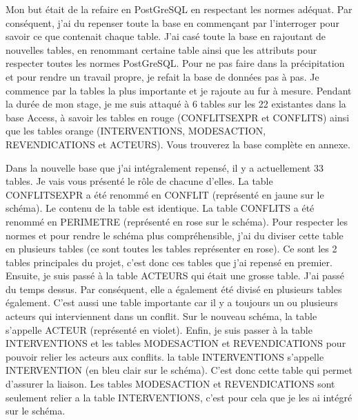 \documentclass[12pt,a4paper,titlepage,twoside]{report}
\begin{document}
Mon but était de la refaire en PostGreSQL en respectant les normes adéquat. Par conséquent, j'ai du repenser toute la base en commençant par l'interroger pour savoir ce que contenait chaque table. J'ai casé toute la base en rajoutant de nouvelles tables, en renommant certaine table ainsi que les attributs pour respecter toutes les normes PostGreSQL. \newline
Pour ne pas faire dans la précipitation et pour rendre un travail propre, je refait la base de données pas à pas. Je commence par la tables la plus importante et je rajoute au fur à mesure. Pendant la durée de mon stage, je me suis attaqué à 6 tables sur les 22 existantes dans la base Access, à savoir les tables en rouge (CONFLITSEXPR et CONFLITS) ainsi que les tables orange (INTERVENTIONS, MODESACTION, REVENDICATIONS et ACTEURS). Vous trouverez la base complète en annexe. \newline\newline

Dans la nouvelle base que j'ai intégralement repensé, il y a actuellement 33 tables. Je vais vous présenté le rôle de chacune d'elles. La table CONFLITSEXPR a été renommé en CONFLIT (représenté en jaune sur le schéma). Le contenu de la table est identique. La table CONFLITS a été renommé en PERIMETRE (représenté en rose sur le schéma). Pour respecter les normes et pour rendre le schéma plus compréhensible, j'ai du diviser cette table en plusieurs tables (ce sont toutes les tables représenter en rose). Ce sont les 2 tables principales du projet, c'est donc ces tables que j'ai repensé en premier.\newline
Ensuite, je suis passé à la table ACTEURS qui était une grosse table. J'ai passé du temps dessus. Par conséquent, elle a également été divisé en plusieurs tables également. C'est aussi une table importante car il y a toujours un ou plusieurs acteurs qui interviennent dans un conflit. Sur le nouveau schéma, la table s'appelle ACTEUR (représenté en violet). \newline
Enfin, je suis passer à la table INTERVENTIONS et les tables MODESACTION et REVENDICATIONS pour pouvoir relier les acteurs aux conflits.  la table INTERVENTIONS s'appelle INTERVENTION (en bleu clair sur le schéma). C'est donc cette table qui permet d'assurer la liaison. Les tables MODESACTION et REVENDICATIONS sont seulement relier a la table INTERVENTIONS, c'est pour cela que je les ai intégré sur le schéma. \newline\newline
\end{document}
